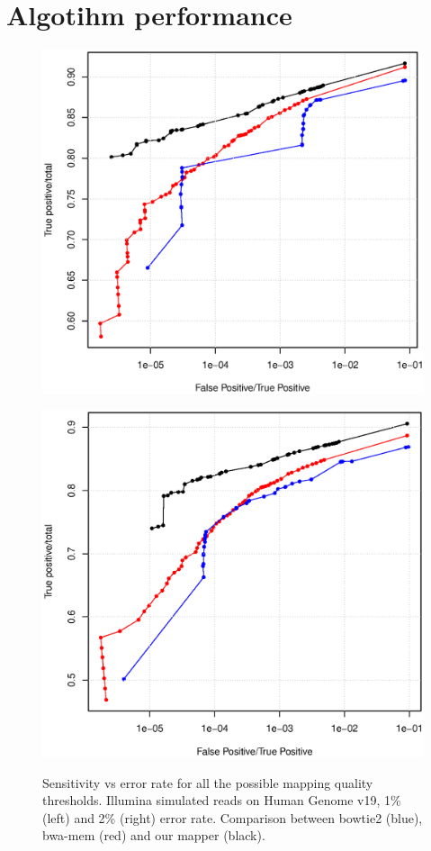 \section{Algotihm performance}
\begin{figure}[h]
	\begin{minipage}[b]{0.5\linewidth}
	  \centering
	  \includegraphics[width=\textwidth]{figures/chap4_hg_1_15}
	  \label{fig:chap4:hg115}
   \end{minipage}
	\begin{minipage}[b]{0.5\linewidth}
	  \centering
	  \includegraphics[width=\textwidth]{figures/chap4_hg_2_15}
	  \label{fig:chap4:hg215}
   \end{minipage}
  \caption{Sensitivity vs error rate for all the possible mapping
       quality thresholds. Illumina simulated reads on Human Genome
       v19, 1\% (left) and 2\% (right) error rate. Comparison between
       bowtie2 (blue), bwa-mem (red) and our mapper (black). }

\end{figure}

